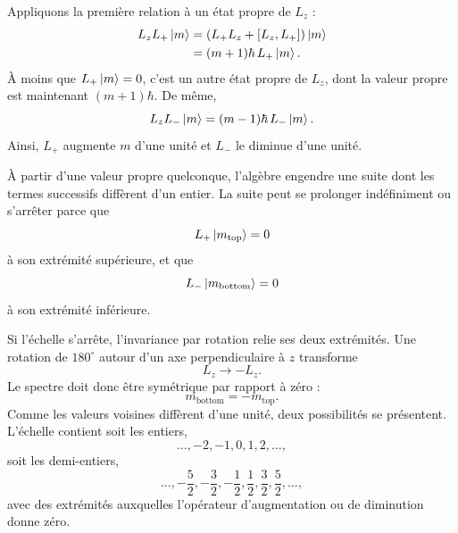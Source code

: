 Appliquons la première relation à un état propre de \(L_z\) :
\begin{align}
L_zL_+\left\lvert m\right\rangle
&=\left(L_+L_z+[L_z,L_+]\right)\left\lvert m\right\rangle\\
&=(m+1)\hbar\,L_+\left\lvert m\right\rangle.
\end{align}
À moins que \(L_+\left\lvert m\right\rangle=0\), c’est un autre état propre de \(L_z\), dont la valeur propre est maintenant \((m+1)\hbar\). De même,
\begin{equation}
L_zL_-\left\lvert m\right\rangle
=(m-1)\hbar\,L_-\left\lvert m\right\rangle.
\end{equation}
Ainsi, \(L_+\) augmente \(m\) d’une unité et \(L_-\) le diminue d’une unité.

À partir d’une valeur propre quelconque, l’algèbre engendre une suite dont les termes successifs diffèrent d’un entier. La suite peut se prolonger indéfiniment ou s’arrêter parce que
\begin{equation}
L_+\left\lvert m_{\mathrm{top}}\right\rangle=0
\end{equation}
à son extrémité supérieure, et que
\begin{equation}
L_-\left\lvert m_{\mathrm{bottom}}\right\rangle=0
\end{equation}
à son extrémité inférieure.

\begin{classroomqa}
\end{classroomqa}

Si l’échelle s’arrête, l’invariance par rotation relie ses deux extrémités. Une rotation de \(180^\circ\) autour d’un axe perpendiculaire à \(z\) transforme
\begin{equation}
L_z\longrightarrow-L_z.
\end{equation}
Le spectre doit donc être symétrique par rapport à zéro :
\begin{equation}
m_{\mathrm{bottom}}=-m_{\mathrm{top}}.
\end{equation}
Comme les valeurs voisines diffèrent d’une unité, deux possibilités se présentent. L’échelle contient soit les entiers,
\begin{equation}
\ldots,-2,-1,0,1,2,\ldots,
\end{equation}
soit les demi-entiers,
\begin{equation}
\ldots,-\frac{5}{2},-\frac{3}{2},-\frac{1}{2},
\frac{1}{2},\frac{3}{2},\frac{5}{2},\ldots,
\end{equation}
avec des extrémités auxquelles l’opérateur d’augmentation ou de diminution donne zéro.

